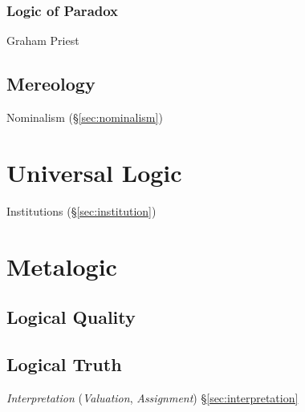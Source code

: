 \subsubsection{Logic of Paradox}\label{sec:logic_of_paradox}

Graham Priest



\subsection{Mereology}\label{sec:mereology}

Nominalism (\S\ref{sec:nominalism})



\section{Universal Logic}\label{sec:universal_logic}

Institutions (\S\ref{sec:institution})



\section{Metalogic}\label{sec:metalogic}

\subsection{Logical Quality}\label{sec:logical_quality}

\subsection{Logical Truth}\label{sec:logical_truth}

\emph{Interpretation} (\emph{Valuation}, \emph{Assignment})
\S\ref{sec:interpretation}

